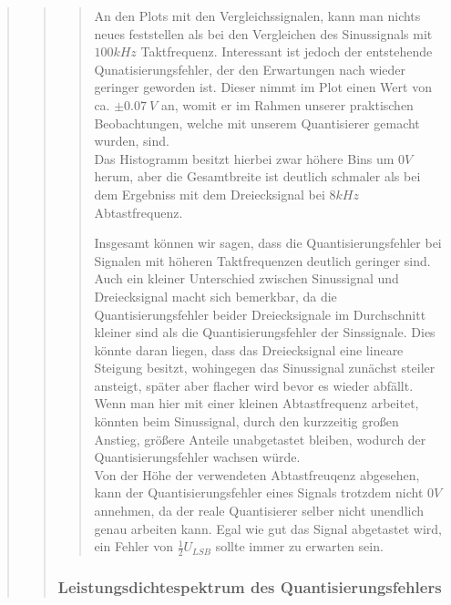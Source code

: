 \begin{quote}
\begin{quote}
\begin{quote}
           An den Plots mit den Vergleichssignalen, kann man nichts neues
           feststellen als bei den Vergleichen des Sinussignals mit $100kHz$
           Taktfrequenz. Interessant ist jedoch der entstehende
           Qunatisierungsfehler, der den Erwartungen nach wieder geringer
           geworden ist. Dieser nimmt im Plot einen Wert von ca. $\pm
           0.07\ V$ an, womit er im Rahmen unserer praktischen
           Beobachtungen, welche mit unserem Quantisierer gemacht wurden,
           sind.\\
           Das Histogramm besitzt hierbei zwar höhere Bins um $0V$ herum, aber
           die Gesamtbreite ist deutlich schmaler als bei dem
           Ergebniss mit dem Dreiecksignal bei $8kHz$ Abtastfrequenz.
           
           \vspace{1em}
           
           Insgesamt können wir sagen, dass die Quantisierungsfehler bei
           Signalen mit höheren Taktfrequenzen deutlich geringer sind. Auch ein
           kleiner Unterschied zwischen Sinussignal und Dreiecksignal macht sich
           bemerkbar, da die Quantisierungsfehler beider Dreiecksignale im
           Durchschnitt kleiner sind als die Quantisierungsfehler der
           Sinssignale. Dies könnte daran liegen, dass das Dreiecksignal eine
           lineare Steigung besitzt, wohingegen das Sinussignal zunächst
           steiler ansteigt, später aber flacher wird bevor es wieder abfällt.
           Wenn man hier mit einer kleinen Abtastfrequenz arbeitet, könnten beim
           Sinussignal, durch den kurzzeitig großen Anstieg, größere Anteile
           unabgetastet bleiben, wodurch der Quantisierungsfehler wachsen
           würde.\\
           
           Von der Höhe der verwendeten Abtastfreuqenz abgesehen, kann der
           Quantisierungsfehler eines Signals trotzdem nicht $0V$ annehmen, da
           der reale Quantisierer selber nicht unendlich genau arbeiten kann.
           Egal wie gut das Signal abgetastet wird, ein Fehler von $\frac{1}{2}U_{LSB}$
           sollte immer zu erwarten sein. 
           
        \end{quote}  %
        
        \subsubsection{Leistungsdichtespektrum des Quantisierungsfehlers}
		\begin{quote}
		

\end{quote}
\end{quote}
\end{quote}
